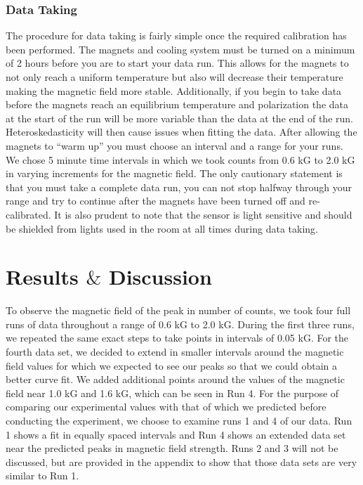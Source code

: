 \subsubsection{Data Taking}

The procedure for data taking is fairly simple once the required calibration has been performed.  The magnets and cooling system must be turned on a minimum of 2 hours before you are to start your data run.  This allows for the magnets to not only reach a uniform temperature but also will decrease their temperature making the magnetic field more stable. Additionally, if you begin to take data before the magnets reach an equilibrium temperature and polarization the data at the start of the run will be more variable than the data at the end of the run. Heteroskedasticity will then cause issues when fitting the data. After allowing the magnets to ``warm up'' you must choose an interval and a range for your runs.  We chose 5 minute time intervals in which we took counts from 0.6 kG to 2.0 kG in varying increments for the magnetic field.  The only cautionary statement is that you must take a complete data run, you can not stop halfway through your range and try to continue after the magnets have been turned off and re-calibrated. It is also prudent to note that the sensor is light sensitive and should be shielded from lights used in the room at all times during data taking. 

\section{Results $\&$ Discussion}
To observe the magnetic field of the peak in number of counts, we took four full runs of data throughout a range of 0.6 kG to 2.0 kG. During the first three runs, we repeated the same exact steps to take points in intervals of 0.05 kG. For the fourth data set, we decided to extend in smaller intervals around the magnetic field values for which we expected to see our peaks so that we could obtain a better curve fit. We added additional points around the values of the magnetic field near 1.0 kG and 1.6 kG, which can be seen in Run 4. For the purpose of comparing our experimental values with that of which we predicted before conducting the experiment, we choose to examine runs 1 and 4 of our data. Run 1 shows a fit in equally spaced intervals and Run 4 shows an extended data set near the predicted peaks in magnetic field strength. Runs 2 and 3 will not be discussed, but are provided in the appendix to show that those data sets are very similar to Run 1. \\

